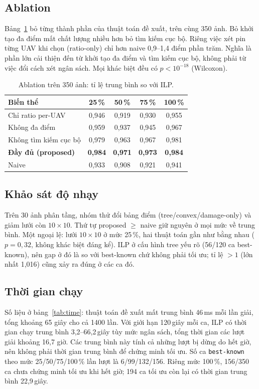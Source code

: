 \documentclass[conference]{IEEEtran}
\begin{document}
\subsection{Ablation}
Bảng~\ref{tab:ablation} bỏ từng thành phần của thuật toán đề xuất, trên cùng 350 ảnh. Bỏ
khởi tạo đa điểm mất chất lượng nhiều hơn bỏ tìm kiếm cục bộ. Riêng việc xét pin từng UAV khi chọn
(ratio-only) chỉ hơn naive 0,9--1,4 điểm phần trăm. Nghĩa là phần lớn cải thiện đến từ khởi tạo đa điểm
và tìm kiếm cục bộ, không phải từ việc đổi cách xét ngân sách. Mọi khác biệt đều có
$p < 10^{-18}$ (Wilcoxon).

\begin{table}[!t]
\centering
\caption{Ablation trên 350 ảnh: tỉ lệ trung bình so với ILP.}
\label{tab:ablation}
\begin{tabular}{lcccc}
\toprule
Biến thể & 25\,\% & 50\,\% & 75\,\% & 100\,\% \\
\midrule
Chỉ ratio per-UAV & 0{,}946 & 0{,}919 & 0{,}930 & 0{,}955 \\
Không đa điểm & 0{,}959 & 0{,}937 & 0{,}945 & 0{,}967 \\
Không tìm kiếm cục bộ & 0{,}979 & 0{,}963 & 0{,}967 & 0{,}981 \\
\textbf{Đầy đủ (proposed)} & \textbf{0{,}984} & \textbf{0{,}971} & \textbf{0{,}973} & \textbf{0{,}984} \\
\midrule
Naive & 0{,}933 & 0{,}908 & 0{,}921 & 0{,}941 \\
\bottomrule
\end{tabular}
\end{table}

\subsection{Khảo sát độ nhạy}
Trên 30 ảnh phân tầng, nhóm thử đổi bảng điểm (tree/convex/damage-only) và giảm lưới còn
$10\times10$. Thứ tự proposed $\ge$ naive giữ nguyên ở mọi mức về trung bình. Một ngoại lệ: lưới $10\times10$ ở mức 25\,\%, hai thuật toán gần như bằng nhau ($p = 0{,}32$,
không khác biệt đáng kể). ILP ở cấu hình tree yếu rõ (56/120 ca best-known), nên
gap ở đó là so với best-known chứ không phải tối ưu; tỉ lệ $>1$ (lớn nhất 1{,}016) cũng
xảy ra đúng ở các ca đó.

\subsection{Thời gian chạy}
Số liệu ở bảng~\ref{tab:time}: thuật toán đề xuất mất trung bình 46\,ms mỗi lần giải, tổng
khoảng 65 giây cho cả 1400 lần. Với giới hạn 120\,giây mỗi ca, ILP có thời gian chạy trung
bình 3,2--66,2\,giây tùy mức ngân sách, tổng thời gian các lượt giải khoảng 16,7 giờ.
Các trung bình này tính cả những lượt bị dừng do hết giờ, nên không phải thời gian
trung bình để chứng minh tối ưu. Số ca \texttt{best-known} theo mức 25/50/75/100\,\%
lần lượt là 6/99/132/156. Riêng mức 100\,\%, 156/350 ca chưa chứng minh tối ưu khi hết giờ;
194 ca tối ưu còn lại có thời gian trung bình 22,9\,giây.
\end{document}
